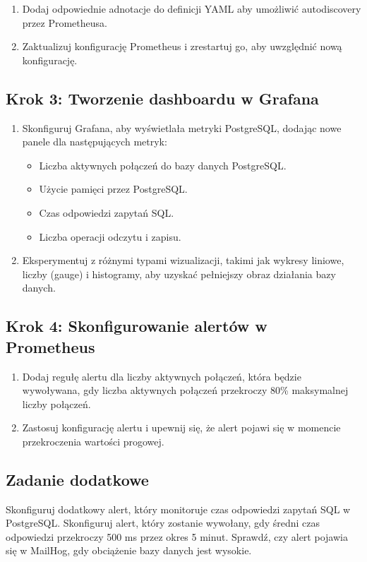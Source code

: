 \documentclass{article}
\begin{document}
\begin{enumerate}
  \item Dodaj odpowiednie adnotacje do definicji YAML aby umożliwić autodiscovery przez Prometheusa.
  \item Zaktualizuj konfigurację Prometheus i zrestartuj go, aby uwzględnić nową konfigurację.
\end{enumerate}

\subsection{Krok 3: Tworzenie dashboardu w Grafana}

\begin{enumerate}
    \item Skonfiguruj Grafana, aby wyświetlała metryki PostgreSQL, dodając nowe panele dla następujących metryk:
    \begin{itemize}
        \item Liczba aktywnych połączeń do bazy danych PostgreSQL.
        \item Użycie pamięci przez PostgreSQL.
        \item Czas odpowiedzi zapytań SQL.
        \item Liczba operacji odczytu i zapisu.
    \end{itemize}

    \item Eksperymentuj z różnymi typami wizualizacji, takimi jak wykresy liniowe, liczby (gauge) i histogramy, aby uzyskać pełniejszy obraz działania bazy danych.
\end{enumerate}

\subsection{Krok 4: Skonfigurowanie alertów w Prometheus}

\begin{enumerate}
    \item Dodaj regułę alertu dla liczby aktywnych połączeń, która będzie wywoływana, gdy liczba aktywnych połączeń przekroczy 80\% maksymalnej liczby połączeń.
    
    \item Zastosuj konfigurację alertu i upewnij się, że alert pojawi się w momencie przekroczenia wartości progowej.
\end{enumerate}

\subsection{Zadanie dodatkowe}

Skonfiguruj dodatkowy alert, który monitoruje czas odpowiedzi zapytań SQL w PostgreSQL. Skonfiguruj alert, który zostanie wywołany, gdy średni czas odpowiedzi przekroczy 500 ms przez okres 5 minut. Sprawdź, czy alert pojawia się w MailHog, gdy obciążenie bazy danych jest wysokie.
\end{document}
